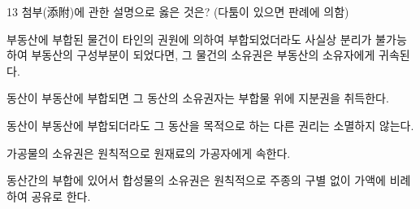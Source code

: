 \begin{question}{13}
첨부(添附)에 관한 설명으로 옳은 것은? (다툼이 있으면 판례에 의함)
\begin{choices}
  \item 부동산에 부합된 물건이 타인의 권원에 의하여 부합되었더라도 사실상 분리가 불가능하여 부동산의 구성부분이 되었다면, 그 물건의 소유권은 부동산의 소유자에게 귀속된다.
  \item 동산이 부동산에 부합되면 그 동산의 소유권자는 부합물 위에 지분권을 취득한다.
  \item 동산이 부동산에 부합되더라도 그 동산을 목적으로 하는 다른 권리는 소멸하지 않는다.
  \item 가공물의 소유권은 원칙적으로 원재료의 가공자에게 속한다.
  \item 동산간의 부합에 있어서 합성물의 소유권은 원칙적으로 주종의 구별 없이 가액에 비례하여 공유로 한다.
\end{choices}
\end{question}
